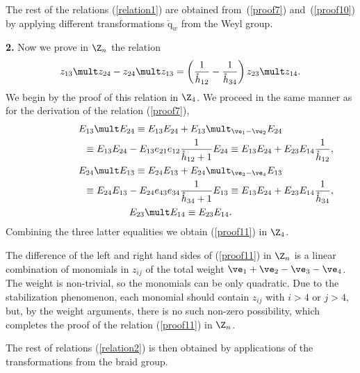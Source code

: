 \documentclass[11pt]{article}
\def\nplus{\mathfrak{n}}\def\nn{\nonumber}\def\nin{\noindent}
\def\q{\check{\mathrm q}}\def\Q{\mathrm{Q}}\def\r#1{(\ref{#1})}\let\rf=\r
\def\s{z}\def\S{\mathrm {S}}\def\si{\sigma}\def\Sp{\S^{\nplus}}\def\sy{\acute{\sigma}}\def\th{\mathring{h}}
\numberwithin{equation}{section}
\begin{document}
The rest of the relations \rf{relation1} are obtained from~\rf{proof7} and~\rf{proof10}
by applying dif\/ferent transformations $\q_w$ from the Weyl group.

{\bf 2.} Now we prove in $\Z_n$ the relation
\begin{gather}\label{proof11}
\s_{13}\mult\s_{24}-\s_{24}\mult\s_{13}=
\left(\frac{1}{\th_{12}}-\frac{1}{\th_{34}}\right)\s_{23}\mult\s_{14}  .
\end{gather}
We begin by the proof of this relation in $\Z_4$. We proceed in the same manner as for the derivation of the
relation (\ref{proof7}),
\begin{gather*}E_{13}\mult E_{24}\equiv E_{13}E_{24}+E_{13}\mult_{\ve_1-\ve_2} E_{24} \\
\phantom{E_{13}\mult E_{24}}{} \equiv
E_{13}E_{24}-E_{13}e_{21}e_{12}  \frac{1}{\th_{12}+1} E_{24}
 \equiv E_{13}E_{24}+E_{23}E_{14} \frac{1}{\th_{12}}  ,\\
 E_{24}\mult E_{13}\equiv E_{24}E_{13}+E_{24}\mult_{\ve_3-\ve_4} E_{13}\\
 \phantom{E_{24}\mult E_{13}}{}  \equiv
E_{24}E_{13}-E_{24}e_{43}e_{34}  \frac{1}{\th_{34}+1} E_{13} \equiv E_{13}E_{24}+E_{23}E_{14}  \frac{1}{\th_{34}}  ,\\
 E_{23}\mult E_{14} \equiv E_{23}E_{14}  .
 \end{gather*}
Combining the three latter equalities we obtain \rf{proof11} in $\Z_4$.


The dif\/ference of the left and right hand sides of \rf{proof11} in $\Z_n$ is a linear combination of monomials in $\s_{ij}$ of
the total weight $\ve_1+\ve_2-\ve_3-\ve_4$. The weight is non-trivial, so the monomials can be only quadratic.
Due to the stabilization phenomenon, each monomial should contain $\s_{ij}$ with $i>4$ or $j>4$, but, by the weight arguments,
there is no such non-zero possibility, which completes the proof of the relation \rf{proof11} in $\Z_n$.


The rest of relations \rf{relation2} is then obtained by applications of the transformations from the braid group.
\end{document}
